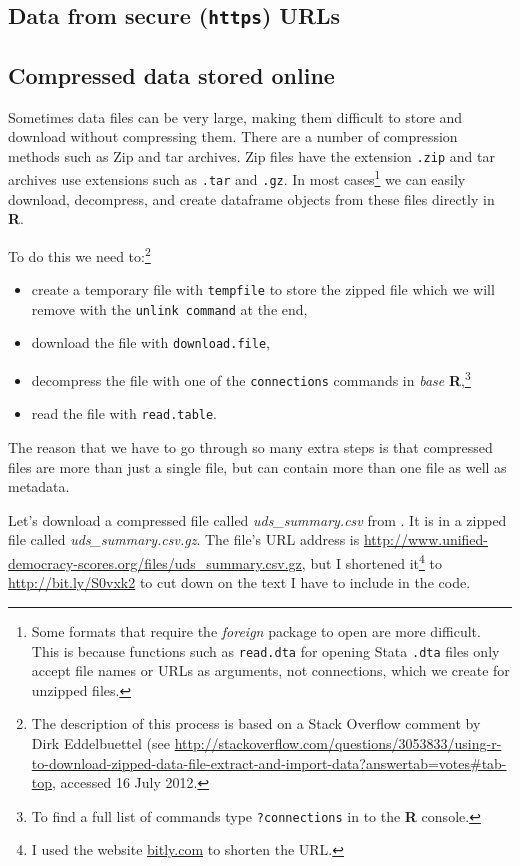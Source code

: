 \documentclass[ChapterTOCs,krantz1]{krantz}\usepackage{graphicx, color}
\begin{document}
{{\subsection{Data from secure ({\tt{https}}) URLs}

\subsection{Compressed data stored online}

Sometimes data files can be very large, making them difficult to store and download without compressing them. There are a number of compression methods such as Zip and tar archives. Zip files have the extension {\tt{.zip}} and tar archives use extensions such as {\tt{.tar}} and {\tt{.gz}}. In most cases\footnote{Some formats that require the {\emph{foreign}} package to open are more difficult. This is because functions such as {\tt{read.dta}} for opening Stata {\tt{.dta}} files only accept file names or URLs as arguments, not connections, which we create for unzipped files.} we can easily download, decompress, and create dataframe objects from these files directly in {\bf{R}}. 

To do this we need to:\footnote{The description of this process is based on a Stack Overflow comment by Dirk Eddelbuettel (see {\url{http://stackoverflow.com/questions/3053833/using-r-to-download-zipped-data-file-extract-and-import-data?answertab=votes\#tab-top}}, accessed 16 July 2012.}

\begin{itemize}
    \item create a temporary file with {\tt{tempfile}} to store the zipped file which we will remove with the {\tt{unlink command}} at the end,
    \item download the file with {\tt{download.file}},
    \item decompress the file with one of the {\tt{connections}} commands in {\emph{base}} {\bf{R}},\footnote{To find a full list of commands type {\tt{?connections}} in to the {\bf{R}} console.}
    \item read the file with {\tt{read.table}}. 
\end{itemize}

The reason that we have to go through so many extra steps is that compressed files are more than just a single file, but can contain more than one file as well as metadata.

Let's download a compressed file called {\emph{uds\_summary.csv}} from \cite{Pemstein2010}. It is in a zipped file called {\emph{uds\_summary.csv.gz}}. The file's URL address is {\url{http://www.unified-democracy-scores.org/files/uds_summary.csv.gz}}, but I shortened it\footnote{I used the website \url{bitly.com} to shorten the URL.} to \url{http://bit.ly/S0vxk2} to cut down on the text I have to include in the code.

}}
\end{document}
